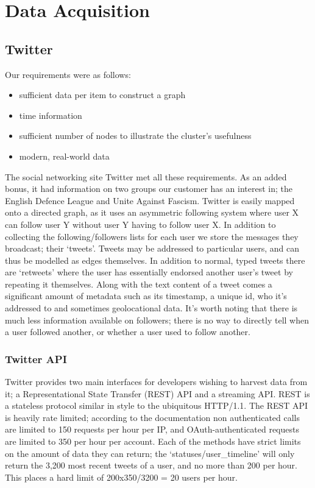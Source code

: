 \section{Data Acquisition}

\subsection{Twitter}
Our requirements were as follows:
\begin{itemize}
\item sufficient data per item to construct a graph
\item time information
\item sufficient number of nodes to illustrate the cluster’s usefulness
\item modern, real-world data
\end{itemize}

The social networking site Twitter met all these requirements. As an added bonus, it had information on two groups our customer has an interest in; the English Defence League and Unite Against Fascism. Twitter is easily mapped onto a directed graph, as it uses an asymmetric following system where user X can follow user Y without user Y having to follow user X. In addition to collecting the following/followers lists for each user we store the messages they broadcast; their `tweets’. Tweets may be addressed to particular users, and can thus be modelled as edges themselves. In addition to normal, typed tweets there are  ‘retweets’ where the user has essentially endorsed another user’s tweet by repeating it themselves. Along with the text content of a tweet comes a significant amount of metadata such as its timestamp, a unique id, who it’s addressed to and sometimes geolocational data. It’s worth noting that there is much less information available on followers; there is no way to directly tell when a user followed another, or whether a user used to follow another.

\subsubsection{Twitter API}
Twitter provides two main interfaces for developers wishing to harvest data from it; a Representational State Transfer (REST) API and a streaming API. REST is a stateless protocol similar in style to the ubiquitous HTTP/1.1. The REST API is heavily rate limited; according to the documentation non authenticated calls are limited to 150 requests per hour per IP, and OAuth-authenticated requests are limited to 350 per hour per account. Each of the methods have strict limits on the amount of data they can return; the ‘statuses/user_timeline’ will only return the 3,200 most recent tweets of a user, and no more than 200 per hour. This places a hard limit of 200x350/3200 = 20 users per hour.

